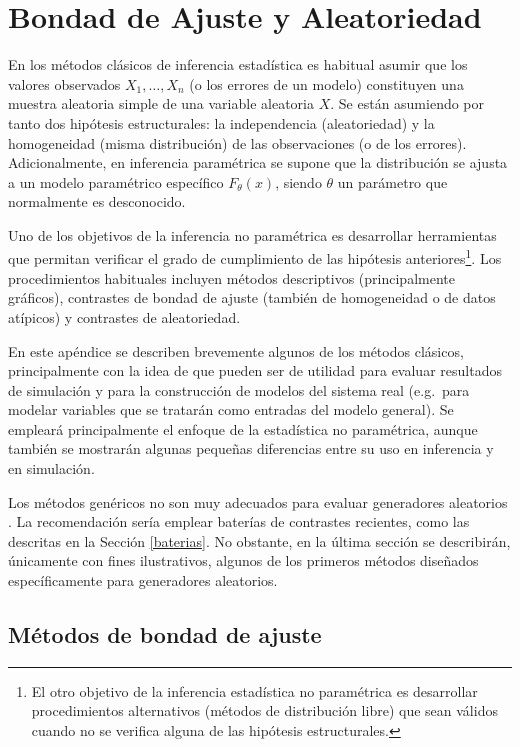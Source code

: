 \documentclass[
  spanish,
  10pt,
]{book}
\theoremstyle{break}
\theoremstyle{nonumberplain}
\let\oldfootnote\footnote
\renewcommand\footnote[1]{\oldfootnote{\hspace{2mm}#1}}
\begin{document}
\appendix


\chapter{Bondad de Ajuste y Aleatoriedad}\label{gof-aleat}

En los métodos clásicos de inferencia estadística es habitual asumir que los valores observados \(X_1,\ldots, X_n\) (o los errores de un modelo) constituyen una muestra aleatoria simple de una variable aleatoria \(X\).
Se están asumiendo por tanto dos hipótesis estructurales: la independencia (aleatoriedad) y la homogeneidad (misma distribución) de las observaciones (o de los errores).
Adicionalmente, en inferencia paramétrica se supone que la distribución se ajusta a un modelo
paramétrico específico \(F_{\theta}(x)\), siendo \(\theta\) un parámetro que normalmente es desconocido.

Uno de los objetivos de la inferencia no paramétrica es desarrollar herramientas que permitan verificar el grado de cumplimiento de las hipótesis anteriores\footnote{
  El otro objetivo de la inferencia estadística no paramétrica es desarrollar procedimientos alternativos (métodos de distribución libre) que sean válidos cuando no se verifica alguna de las hipótesis estructurales.}.
Los procedimientos habituales incluyen métodos descriptivos (principalmente gráficos), contrastes de bondad de ajuste (también de homogeneidad o de datos atípicos) y contrastes de aleatoriedad.

En este apéndice se describen brevemente algunos de los métodos clásicos, principalmente con la idea de que pueden ser de utilidad para evaluar resultados de simulación y para la construcción de modelos del sistema real (e.g.~para modelar variables que se tratarán como entradas del modelo general). Se empleará principalmente el enfoque de la estadística no paramétrica, aunque también se mostrarán algunas pequeñas diferencias entre su uso en inferencia y en simulación.

Los métodos genéricos no son muy adecuados para evaluar generadores aleatorios \citep[e.g.][]{lecuyer07}.
La recomendación sería emplear baterías de contrastes recientes, como las descritas en la Sección \ref{baterias}.
No obstante, en la última sección se describirán, únicamente con fines ilustrativos, algunos de los primeros métodos diseñados específicamente para generadores aleatorios.

\section{Métodos de bondad de ajuste}\label{gof}
\end{document}
